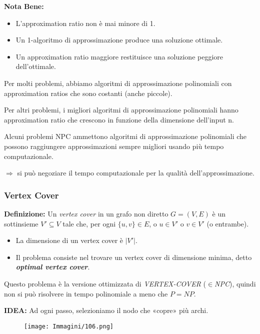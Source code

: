\documentclass{article}
\begin{document}
\textbf{Nota Bene:}
\begin{itemize}
    \item L’approximation ratio non è mai minore di 1.
    \item Un 1-algoritmo di approssimazione produce una soluzione ottimale.
    \item Un approximation ratio maggiore restituisce una soluzione peggiore dell’ottimale.
\end{itemize}

Per molti problemi, abbiamo algoritmi di approssimazione polinomiali con
approximation ratios che sono costanti (anche piccole).

Per altri problemi, i migliori algoritmi di approssimazione polinomiali hanno
approximation ratio che crescono in funzione della dimensione dell’input n.

Alcuni problemi NPC ammettono algoritmi di approssimazione polinomiali che
possono raggiungere approssimazioni sempre migliori usando più tempo
computazionale.

$\Rightarrow$ si può negoziare il tempo computazionale per la qualità dell’approssimazione.

\subsubsection{Vertex Cover}
\textbf{Definizione:} Un \textit{vertex cover} in un grafo non diretto $G = (V, E)$ è un sottinsieme $V' \subseteq V$ tale che, per ogni $\{u, v\} \in E$, o $u \in V'$ o $v \in V'$ (o entrambe).

\begin{itemize}
    \item La dimensione di un vertex cover è $|V'|$.
    \item Il problema consiste nel trovare un vertex cover di dimensione minima, detto \textbf{\textit{optimal vertex cover}}.
\end{itemize}

\begin{tcolorbox}[colback=red!10!white, colframe=red!50!black, title=Osservazione]
    Questo problema è la versione ottimizzata di \textit{VERTEX-COVER} ($\in$\textit{NPC}), quindi non si può risolvere in tempo polinomiale a meno che $P = NP$.
\end{tcolorbox}

\newpage
\textbf{IDEA:} Ad ogni passo, selezioniamo il nodo che «copre» più archi.

\begin{figure}[H]
    \centering
    \texttt{[image: Immagini/106.png]}
    \label{algo_vertex_cover}
\end{figure}
\end{document}
